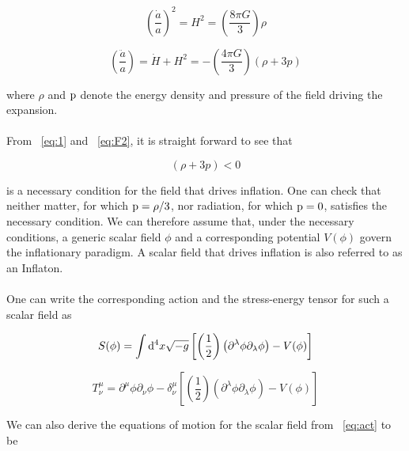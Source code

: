 \documentclass[12pt,a4paper,oneside]{book}
\begin{document}
\begin{equation}\label{eq:F1}
\left(\frac{\dot{a}}{a}\right)^2 = H^2 = \left(\frac{8\pi G}{3}\right)\rho
\end{equation}

\begin{equation}\label{eq:F2}
\left(\frac{\ddot{a}}{a}\right) = \dot{H} + H^2= -\left(\frac{4\pi G}{3}\right)(\rho + 3p)
\end{equation}

\noindent where $\rho$ and ${\rm p}$ denote the energy density and pressure of the field driving the expansion.

\paragraph*{} From ~\ref{eq:1} and ~\ref{eq:F2}, it is straight forward to see that

\begin{equation}
(\rho + 3p) < 0
\end{equation}

\noindent is a necessary condition for the field that drives inflation. One can check that neither matter, for which ${\rm p} = \rho/3$, 
nor radiation, for which ${\rm p} = 0$, satisfies the necessary condition. We can therefore assume that, under the necessary conditions, 
a generic scalar field $\phi$ and a corresponding potential $V(\phi)$ govern the inflationary paradigm. A scalar field that drives inflation 
is also referred to as an Inflaton.

\paragraph*{} One can write the corresponding action and the stress-energy tensor for such a scalar field as

\begin{equation}\label{eq:act}
S(\phi) = \int {\rm d}^4x \sqrt{-g}\left[ \left(\frac{1}{2}\right)\left(\partial^{\lambda}\phi \partial_{\lambda}\phi\right) - V(\phi)\right]
\end{equation}

\begin{equation}\label{eq:se}
T^{\mu}_{\nu} = \partial^{\mu}\phi \partial_{\nu}\phi -\delta^{\mu}_{\nu}\left[\left(\frac{1}{2}\right)\left(\partial^{\lambda}\phi \partial_{\lambda}\phi\right) - V(\phi)\right]
\end{equation}

\noindent We can also derive the equations of motion for the scalar field from ~\ref{eq:act} to be
\end{document}
